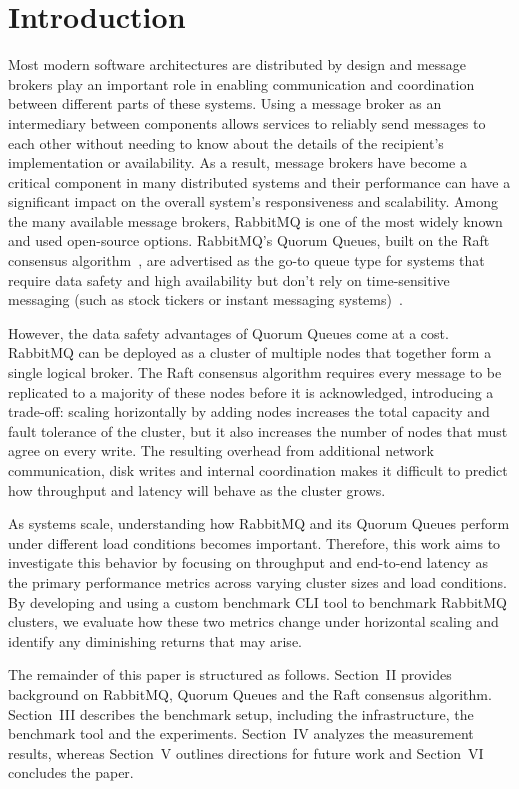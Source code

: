 \section{Introduction}

Most modern software architectures are distributed by design and message brokers play an important role in enabling communication and coordination between different parts of these systems. Using a message broker as an intermediary between components allows services to reliably send messages to each other without needing to know about the details of the recipient's implementation or availability. As a result, message brokers have become a critical component in many distributed systems and their performance can have a significant impact on the overall system's responsiveness and scalability. Among the many available message brokers, RabbitMQ is one of the most widely known and used open-source options. RabbitMQ's Quorum Queues, built on the Raft consensus algorithm~\cite{raft_paper}, are advertised as the go-to queue type for systems that require data safety and high availability but don't rely on time-sensitive messaging (such as stock tickers or instant messaging systems)~\cite{rmq_quorum_docs}.

However, the data safety advantages of Quorum Queues come at a cost. RabbitMQ can be deployed as a cluster of multiple nodes that together form a single logical broker. The Raft consensus algorithm requires every message to be replicated to a majority of these nodes before it is acknowledged, introducing a trade-off: scaling horizontally by adding nodes increases the total capacity and fault tolerance of the cluster, but it also increases the number of nodes that must agree on every write. The resulting overhead from additional network communication, disk writes and internal coordination makes it difficult to predict how throughput and latency will behave as the cluster grows.

As systems scale, understanding how RabbitMQ and its Quorum Queues perform under different load conditions becomes important. Therefore, this work aims to investigate this behavior by focusing on throughput and end-to-end latency as the primary performance metrics across varying cluster sizes and load conditions. By developing and using a custom benchmark CLI tool to benchmark RabbitMQ clusters, we evaluate how these two metrics change under horizontal scaling and identify any diminishing returns that may arise.

The remainder of this paper is structured as follows. Section~II provides background on RabbitMQ, Quorum Queues and the Raft consensus algorithm. Section~III describes the benchmark setup, including the infrastructure, the benchmark tool and the experiments. Section~IV analyzes the measurement results, whereas Section~V outlines directions for future work and Section~VI concludes the paper.

